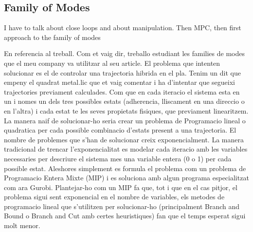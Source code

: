 \documentclass[12,twoside]{TFG-GM}
\theoremstyle{definition}
\theoremstyle{remark}
\begin{document}
\subsection{Family of Modes}
\label{subsec:FOM}
I have to talk about close loops and about manipulation. Then MPC, then first approach to the family of modes

En referencia al treball. Com et vaig dir, treballo estudiant les families de modes que el meu company va utilitzar al seu article. El problema que intenten solucionar es el de controlar una trajectoria hibrida en el pla. Tenim un dit que empeny el quadrat metal.lic que et vaig comentar i ha d'intentar que segueixi trajectories previament calculades. Com que en cada iteracio el sistema esta en un i nomes un dels tres possibles estats (adherencia, lliscament en una direccio o en l'altra) i cada estat te les seves propietats fisiques, que previament linearitzem. La manera naif de solucionar-ho seria crear un problema de Programacio lineal o quadratica per cada possible combinacio d'estats present a una trajectoria. El nombre de problemes que s'han de solucionar creix exponencialment. La manera tradicional de trencar l'exponencialitat es modelar cada iteracio amb les variables necessaries per descriure el sistema mes una variable entera (0 o 1) per cada possible estat. Aleshores simplement es formula el problema com un problema de Programacio Entera Mixte (MIP) i es soluciona amb algun programa especialitzat com ara Gurobi. Plantejar-ho com un MIP fa que, tot i que en el cas pitjor, el problema sigui sent exponencial en el nombre de variables, els metodes de programacio lineal que s'utilitzen per solucionar-ho (principalment Branch and Bound o Branch and Cut amb certes heuristiques) fan que el temps esperat sigui molt menor.
\end{document}
